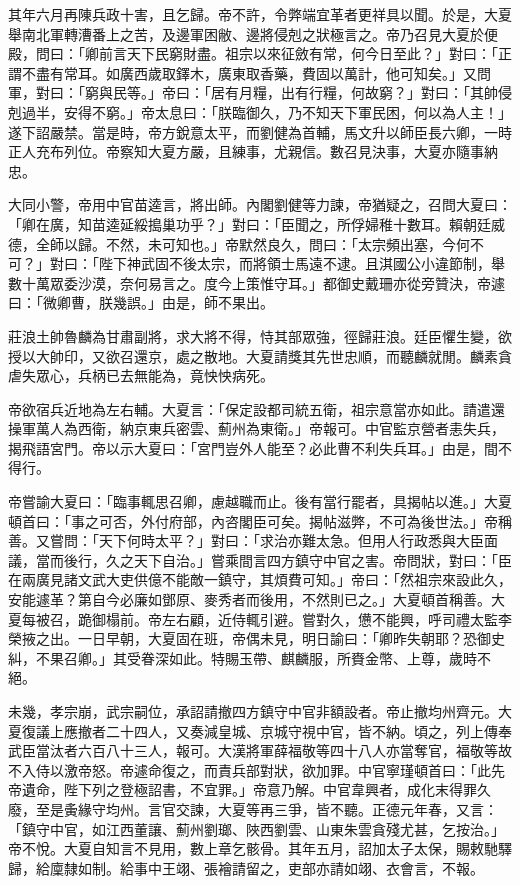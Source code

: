 \begin{pinyinscope}
其年六月再陳兵政十害，且乞歸。帝不許，令弊端宜革者更祥具以聞。於是，大夏舉南北軍轉漕番上之苦，及邊軍困敝、邊將侵剋之狀極言之。帝乃召見大夏於便殿，問曰：「卿前言天下民窮財盡。祖宗以來征斂有常，何今日至此？」對曰：「正謂不盡有常耳。如廣西歲取鐸木，廣東取香藥，費固以萬計，他可知矣。」又問軍，對曰：「窮與民等。」帝曰：「居有月糧，出有行糧，何故窮？」對曰：「其帥侵剋過半，安得不窮。」帝太息曰：「朕臨御久，乃不知天下軍民困，何以為人主！」遂下詔嚴禁。當是時，帝方銳意太平，而劉健為首輔，馬文升以師臣長六卿，一時正人充布列位。帝察知大夏方嚴，且練事，尤親信。數召見決事，大夏亦隨事納忠。

大同小警，帝用中官苗逵言，將出師。內閣劉健等力諫，帝猶疑之，召問大夏曰：「卿在廣，知苗逵延綏搗巢功乎？」對曰：「臣聞之，所俘婦稚十數耳。賴朝廷威德，全師以歸。不然，未可知也。」帝默然良久，問曰：「太宗頻出塞，今何不可？」對曰：「陛下神武固不後太宗，而將領士馬遠不逮。且淇國公小違節制，舉數十萬眾委沙漠，奈何易言之。度今上策惟守耳。」都御史戴珊亦從旁贊決，帝遽曰：「微卿曹，朕幾誤。」由是，師不果出。

莊浪土帥魯麟為甘肅副將，求大將不得，恃其部眾強，徑歸莊浪。廷臣懼生變，欲授以大帥印，又欲召還京，處之散地。大夏請獎其先世忠順，而聽麟就閒。麟素貪虐失眾心，兵柄已去無能為，竟怏怏病死。

帝欲宿兵近地為左右輔。大夏言：「保定設都司統五衛，祖宗意當亦如此。請遣還操軍萬人為西衛，納京東兵密雲、薊州為東衛。」帝報可。中官監京營者恚失兵，揭飛語宮門。帝以示大夏曰：「宮門豈外人能至？必此曹不利失兵耳。」由是，間不得行。

帝嘗諭大夏曰：「臨事輒思召卿，慮越職而止。後有當行罷者，具揭帖以進。」大夏頓首曰：「事之可否，外付府部，內咨閣臣可矣。揭帖滋弊，不可為後世法。」帝稱善。又嘗問：「天下何時太平？」對曰：「求治亦難太急。但用人行政悉與大臣面議，當而後行，久之天下自治。」嘗乘間言四方鎮守中官之害。帝問狀，對曰：「臣在兩廣見諸文武大吏供億不能敵一鎮守，其煩費可知。」帝曰：「然祖宗來設此久，安能遽革？第自今必廉如鄧原、麥秀者而後用，不然則已之。」大夏頓首稱善。大夏每被召，跪御榻前。帝左右顧，近侍輒引避。嘗對久，憊不能興，呼司禮太監李榮掖之出。一日早朝，大夏固在班，帝偶未見，明日諭曰：「卿昨失朝耶？恐御史糾，不果召卿。」其受眷深如此。特賜玉帶、麒麟服，所賚金幣、上尊，歲時不絕。

未幾，孝宗崩，武宗嗣位，承詔請撤四方鎮守中官非額設者。帝止撤均州齊元。大夏復議上應撤者二十四人，又奏減皇城、京城守視中官，皆不納。頃之，列上傳奉武臣當汰者六百八十三人，報可。大漢將軍薛福敬等四十八人亦當奪官，福敬等故不入侍以激帝怒。帝遽命復之，而責兵部對狀，欲加罪。中官寧瑾頓首曰：「此先帝遺命，陛下列之登極詔書，不宜罪。」帝意乃解。中官韋興者，成化末得罪久廢，至是夤緣守均州。言官交諫，大夏等再三爭，皆不聽。正德元年春，又言：「鎮守中官，如江西董讓、薊州劉瑯、陜西劉雲、山東朱雲貪殘尤甚，乞按治。」帝不悅。大夏自知言不見用，數上章乞骸骨。其年五月，詔加太子太保，賜敕馳驛歸，給廩隸如制。給事中王翊、張襘請留之，吏部亦請如翊、衣會言，不報。


\end{pinyinscope}
